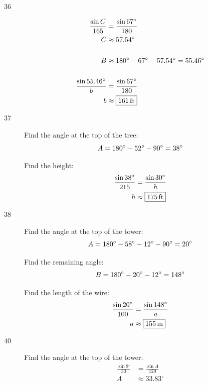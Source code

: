 \documentclass{exam}
\newcommand{\dg}{\ensuremath{^\circ}}
\begin{document}
\begin{description}
      \item[36] 
        \begin{align*}
          \frac{\sin C}{165} & = \frac{\sin 67 \dg}{180} \\
          C                  & \approx 57.54 \dg \\
          \\
          B & \approx 180 \dg - 67 \dg - 57.54 \dg = 55.46 \dg \\
          \\
          \frac{\sin 55.46 \dg}{b} & = \frac{\sin 67 \dg}{180} \\
          b                        & \approx \boxed{ \unit[161]{ft} } \\
        \end{align*}

      \item[37] 
        Find the angle at the top of the tree:
        \[
          A = 180 \dg - 52 \dg - 90 \dg = 38 \dg \\
        \]

        Find the height:
        \begin{align*}
          \frac{\sin 38 \dg}{215} & = \frac{\sin 30 \dg}{h} \\
          h                       & \approx \boxed{ \unit[175]{ft} } \\
        \end{align*}

      \item[38] 
        Find the angle at the top of the tower:
        \[
          A = 180 \dg - 58 \dg - 12 \dg - 90 \dg = 20 \dg \\
        \]

        Find the remaining angle:
        \[
          B = 180 \dg - 20 \dg - 12 \dg = 148 \dg \\
        \]

        Find the length of the wire:
        \begin{align*}
          \frac{\sin 20 \dg}{100} & = \frac{\sin 148 \dg}{a} \\
          a                       & \approx \boxed{ \unit[155]{m} } \\
        \end{align*}

      \item[40] 
        Find the angle at the top of the tower:
        \begin{align*}
          \frac{\sin 8 \dg}{30} & = \frac{\sin A}{120} \\
          A                     & \approx 33.83 \dg \\
        \end{align*}


\end{description}
\end{document}
